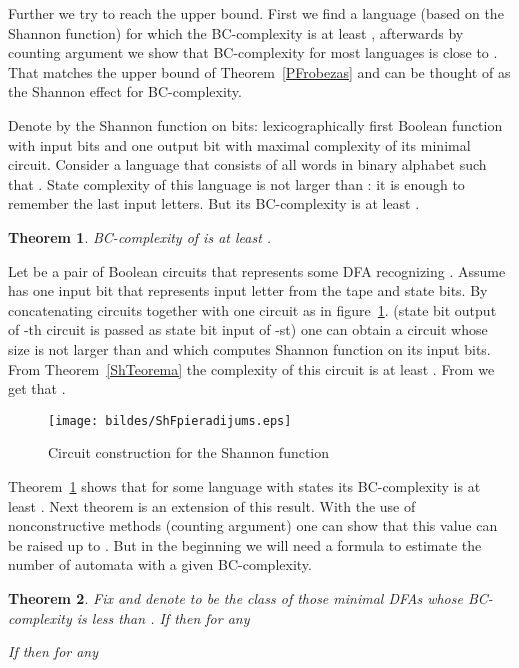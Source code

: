 \documentclass[copyright, creativecommons]{eptcs}
\newcommand{\qed}{}
\newtheorem{theorem}{Theorem}[section]
\newenvironment{proof}[1][Proof]{\begin{trivlist}
\item[\hskip \labelsep {\bfseries #1}]}{\end{trivlist}}
\begin{document}
Further we try to reach the upper bound. First we find a language
(based on the Shannon function) for which the BC-complexity is at least ,
afterwards by counting argument we show that BC-complexity for most
languages is close to . That matches the upper bound of Theorem~\ref{PFrobezas}
and can be thought of as the Shannon effect for BC-complexity.

Denote by  the Shannon function on  bits: lexicographically first Boolean function with  input
bits and one output bit with maximal complexity of its minimal circuit.
Consider a language  that consists of all words  in binary alphabet such that
. 
State complexity of this language is not larger than : it is enough to remember the last  input letters.
But its BC-complexity is at least .

\begin{theorem}
\label{e2}
BC-complexity of  is at least .
\end{theorem}
\begin{proof}
Let  be a pair of Boolean circuits that represents some DFA  recognizing .
Assume  has one input bit that represents input letter from the tape and  state bits. 
By concatenating  circuits  together with one circuit  as in figure~\ref{ShFpieradijums}.
(state bit output of -th circuit is passed as state bit input
of -st) one can obtain a circuit whose size is not larger than  and which
computes Shannon function  on its  input bits.
From Theorem~\ref{ShTeorema} the complexity of this circuit is at least .
From  we get that .
\qed
\end{proof}

\begin{figure}[htb]
	\centering
		\texttt{[image: bildes/ShFpieradijums.eps]}
	\caption{Circuit construction for the Shannon function }
	\label{ShFpieradijums}
\end{figure}



Theorem~\ref{e2} shows that for some language  with  states its BC-complexity is at least .
Next theorem is an extension of this result. With the use of nonconstructive methods (counting argument)
one can show that this value can be raised up to . But in the beginning we will need a formula to estimate
the number of automata with a given BC-complexity.

\begin{theorem}
\label{apaksRobMinim}
Fix  and denote  to be the class of those minimal DFAs
whose BC-complexity is less than . If  then for any  


If  then for any 

\end{theorem}
\end{document}
